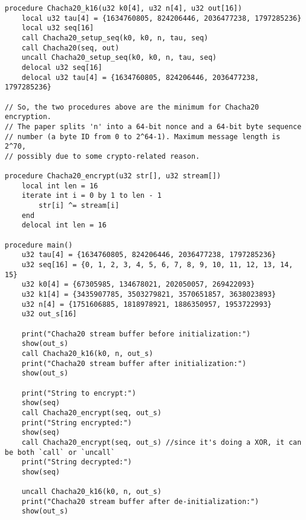 \documentclass[a4paper,10pt,openright]{memoir}
\begin{document}
\begin{lstlisting}[language=Janus,breaklines=true]
procedure Chacha20_k16(u32 k0[4], u32 n[4], u32 out[16])
	local u32 tau[4] = {1634760805, 824206446, 2036477238, 1797285236}
	local u32 seq[16]
	call Chacha20_setup_seq(k0, k0, n, tau, seq)
	call Chacha20(seq, out)
	uncall Chacha20_setup_seq(k0, k0, n, tau, seq)
	delocal u32 seq[16]
	delocal u32 tau[4] = {1634760805, 824206446, 2036477238, 1797285236}

// So, the two procedures above are the minimum for Chacha20 encryption. 
// The paper splits 'n' into a 64-bit nonce and a 64-bit byte sequence 
// number (a byte ID from 0 to 2^64-1). Maximum message length is 2^70, 
// possibly due to some crypto-related reason.

procedure Chacha20_encrypt(u32 str[], u32 stream[])
	local int len = 16
	iterate int i = 0 by 1 to len - 1
		str[i] ^= stream[i]
	end
	delocal int len = 16

procedure main()
	u32 tau[4] = {1634760805, 824206446, 2036477238, 1797285236}
	u32 seq[16] = {0, 1, 2, 3, 4, 5, 6, 7, 8, 9, 10, 11, 12, 13, 14, 15}
	u32 k0[4] = {67305985, 134678021, 202050057, 269422093}
	u32 k1[4] = {3435907785, 3503279821, 3570651857, 3638023893}
	u32 n[4] = {1751606885, 1818978921, 1886350957, 1953722993}
	u32 out_s[16]

	print("Chacha20 stream buffer before initialization:")
	show(out_s)
	call Chacha20_k16(k0, n, out_s)
	print("Chacha20 stream buffer after initialization:")
	show(out_s)
	
	print("String to encrypt:")
	show(seq)
	call Chacha20_encrypt(seq, out_s)
	print("String encrypted:")
	show(seq)
	call Chacha20_encrypt(seq, out_s) //since it's doing a XOR, it can be both `call` or `uncall`
	print("String decrypted:")
	show(seq)
	
	uncall Chacha20_k16(k0, n, out_s)
	print("Chacha20 stream buffer after de-initialization:")
	show(out_s)
\end{lstlisting}
\end{document}
